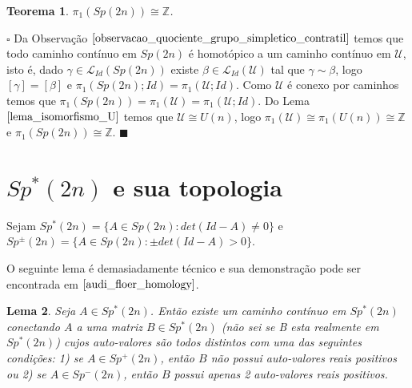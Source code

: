 \documentclass[12pt]{book}
\newtheorem{teorema}{Teorema}[section]
\newtheorem{lema}[teorema]{Lema}
\newenvironment{prova}[1]{$\square$ #1}{\hfill$\blacksquare$}
\newcommand{\caminhospontobasegeral}[2]{\mathcal{L}_{#1}(#2)}
\newcommand{\classe}[1]{[#1]}
\newcommand{\grupofundamental}[1]{\pi_{1}(#1)}
\newcommand{\grupofundamentalpontobase}[2]{\pi_{1}(#1; #2)}
\newcommand{\gruposimpletico}[1]{Sp(#1)}
\newcommand{\gruposimpleticonaodegenerado}[1]{Sp^{#1}(2n)}
\newcommand{\inteiros}{\mathbb{Z}}
\newcommand{\matrizSimpleticaOrtogonal}{\mathcal{U}}
\newcommand{\matrizunitaria}[1]{U(#1)}
\newcommand{\vermelho}[1]{{\color{red}#1}}
\begin{document}
	\begin{teorema}
		$\grupofundamental{\gruposimpletico{2n}} \cong \inteiros$.
	\end{teorema}
	\begin{prova}
		Da Observação $\ref{observacao_quociente_grupo_simpletico_contratil}$ temos que todo caminho contínuo em $\gruposimpletico{2n}$ é homotópico a um caminho contínuo em $\matrizSimpleticaOrtogonal$, isto é, dado $\gamma \in \caminhospontobasegeral{Id }{\gruposimpletico{2n}}$ existe $\beta \in \caminhospontobasegeral{Id}{\matrizSimpleticaOrtogonal}$ tal que $\gamma \sim \beta$, logo $\classe{\gamma} = \classe{\beta}$ e 
		$\grupofundamentalpontobase{\gruposimpletico{2n}}{Id} = \grupofundamentalpontobase{\matrizSimpleticaOrtogonal}{Id}$. Como $\matrizSimpleticaOrtogonal$ é conexo por caminhos temos que $\grupofundamental{\gruposimpletico{2n}} =\grupofundamental{\matrizSimpleticaOrtogonal}= \grupofundamentalpontobase{\matrizSimpleticaOrtogonal}{Id}$. Do Lema $\ref{lema_isomorfismo_U}$ temos que $\matrizSimpleticaOrtogonal\cong \matrizunitaria{n}$, logo $\grupofundamental{\matrizSimpleticaOrtogonal} \cong \grupofundamental{\matrizunitaria{n}} \cong \inteiros$ e $\grupofundamental{\gruposimpletico{2n}} \cong \inteiros$.
	\end{prova}
	
	\section{$\gruposimpleticonaodegenerado{*}$ e sua topologia}
	
	Sejam $\gruposimpleticonaodegenerado{*} = \{ A \in \gruposimpletico{2n}: det(Id-A)\neq 0 \}$ e $\gruposimpleticonaodegenerado{\pm} = \{ A \in \gruposimpletico{2n}: \pm det(Id-A)> 0 \}$.
	
	O seguinte lema é demasiadamente técnico e sua demonstração pode ser encontrada em $\cite{audi_floer_homology}$.
	
	\begin{lema}\label{lema_conectividade_grupo_simlpetico_nao_degenerado}
		Seja $A\in \gruposimpleticonaodegenerado{*}$. Então existe um caminho contínuo em $\gruposimpleticonaodegenerado{*}$ conectando $A$ a uma matriz $B \in \gruposimpleticonaodegenerado{*}$ \vermelho{(não sei se  B esta realmente em $\gruposimpleticonaodegenerado{*}$)} cujos  auto-valores são todos distintos com uma das seguintes condições: 1) se $A\in \gruposimpleticonaodegenerado{+}$, então $B$ não possui auto-valores reais positivos ou 2) se $A\in \gruposimpleticonaodegenerado{-}$, então $B$ possui apenas 2 auto-valores reais positivos.
	\end{lema}
	
\end{document}

